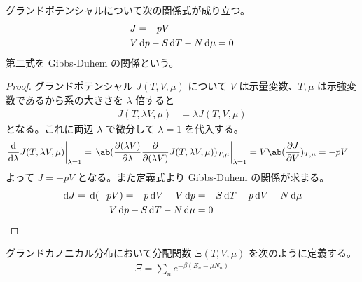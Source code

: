 \documentclass[a4paper,11pt]{jlreq}
\begin{document}
\begin{theorem}
  グランドポテンシャルについて次の関係式が成り立つ。
  \begin{align}
     & J = -pV                           \\
     & V\dl{p} - S\dl{T} - N\dl{\mu} = 0
  \end{align}
  第二式を Gibbs-Duhem の関係という。
\end{theorem}
\begin{proof}
  グランドポテンシャル $J(T, V, \mu)$ について $V$ は示量変数、$T, \mu$ は示強変数であるから系の大きさを $\lambda$ 倍すると
  \begin{align}
    J(T, \lambda V, \mu) & = \lambda J(T, V, \mu)
  \end{align}
  となる。これに両辺 $\lambda$ で微分して $\lambda = 1$ を代入する。
  \begin{align}
    \left.\diff{}{\lambda}J(T, \lambda V, \mu)\right|_{\lambda = 1} & = \left.\ab(\diffp{(\lambda V)}{\lambda}\diffp{}{(\lambda V)}J(T, \lambda V, \mu))_{T,\mu}\right|_{\lambda = 1} = V\ab(\diffp{J}{V})_{T,\mu} = -pV
  \end{align}
  よって $J = -pV$ となる。また定義式より Gibbs-Duhem の関係が求まる。
  \begin{align}
    \dl{J} = \dl{(-pV)} = - p\dl{V} - V\dl{p} & = -S\dl{T} - p\dl{V} - N\dl{\mu} \\
    V\dl{p} - S\dl{T} - N\dl{\mu}             & = 0
  \end{align}
\end{proof}

\begin{definition}[グランドカノニカル分布]
  グランドカノニカル分布において分配関数 $\Xi(T, V, \mu)$ を次のように定義する。
  \begin{align}
    \Xi = \sum_{n}e^{-\beta(E_n - \mu N_n)}
  \end{align}
\end{definition}
\end{document}
